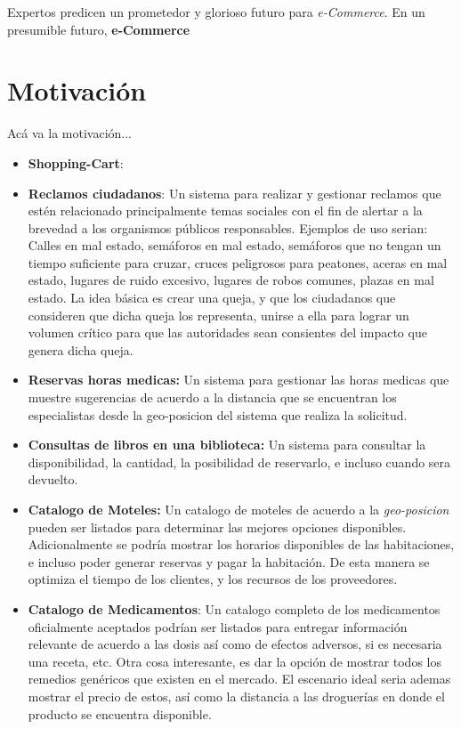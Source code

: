 Expertos predicen un prometedor y glorioso futuro para \textit{e-Commerce}. En un presumible futuro, \textbf{e-Commerce} 


\section{Motivación}\label{cap:intro:motivacion}

Acá va la motivación...

\begin{itemize}
	\item \textbf{Shopping-Cart}:
	
	\item \textbf{Reclamos ciudadanos}: Un sistema para realizar y gestionar reclamos que estén relacionado principalmente temas sociales con el fin de alertar a la brevedad a los organismos públicos responsables. Ejemplos de uso serian: Calles en mal estado, semáforos en mal estado, semáforos que no tengan un tiempo suficiente para cruzar, cruces peligrosos para peatones, aceras en mal estado, lugares de ruido excesivo, lugares de robos comunes, plazas en mal estado. La idea básica es crear una queja, y que los ciudadanos que consideren que dicha queja los representa, unirse a ella para lograr un volumen crítico para que las autoridades sean consientes del impacto que genera dicha queja.
	
	\item \textbf{Reservas horas medicas:} Un sistema para gestionar las horas medicas que muestre sugerencias de acuerdo a la distancia que se encuentran los especialistas desde la geo-posicion del sistema que realiza la solicitud. 
	
	\item \textbf{Consultas de libros en una biblioteca:} Un sistema para consultar la disponibilidad, la cantidad, la posibilidad de reservarlo, e incluso cuando sera devuelto.
	\item \textbf{Catalogo de Moteles:} Un catalogo de moteles de acuerdo a la \textit{geo-posicion} pueden ser listados para determinar las mejores opciones disponibles. Adicionalmente se podría mostrar los horarios disponibles de las habitaciones, e incluso poder generar reservas y pagar la habitación. De esta manera se optimiza el tiempo de los clientes, y los recursos de los proveedores.
	
	\item \textbf{Catalogo de Medicamentos}: Un catalogo completo de los medicamentos oficialmente aceptados podrían ser listados para entregar información relevante de acuerdo a las dosis así como de efectos adversos, si es necesaria una receta, etc. Otra cosa interesante, es dar la opción de mostrar todos los remedios genéricos que existen en el mercado. El escenario ideal seria ademas mostrar el precio de estos, así como la distancia a las droguerías en donde el producto se encuentra disponible.
	

\end{itemize}
